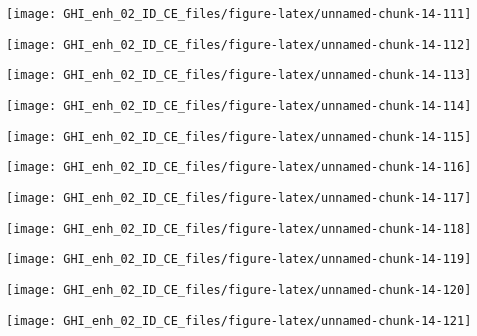 \documentclass[
  10pt,
  a4paper,oneside]{article}
\begin{document}
\begin{center}\texttt{[image: GHI\_enh\_02\_ID\_CE\_files/figure-latex/unnamed-chunk-14-111]} \end{center}

\begin{center}\texttt{[image: GHI\_enh\_02\_ID\_CE\_files/figure-latex/unnamed-chunk-14-112]} \end{center}

\begin{center}\texttt{[image: GHI\_enh\_02\_ID\_CE\_files/figure-latex/unnamed-chunk-14-113]} \end{center}

\begin{center}\texttt{[image: GHI\_enh\_02\_ID\_CE\_files/figure-latex/unnamed-chunk-14-114]} \end{center}

\begin{center}\texttt{[image: GHI\_enh\_02\_ID\_CE\_files/figure-latex/unnamed-chunk-14-115]} \end{center}

\begin{center}\texttt{[image: GHI\_enh\_02\_ID\_CE\_files/figure-latex/unnamed-chunk-14-116]} \end{center}

\begin{center}\texttt{[image: GHI\_enh\_02\_ID\_CE\_files/figure-latex/unnamed-chunk-14-117]} \end{center}

\begin{center}\texttt{[image: GHI\_enh\_02\_ID\_CE\_files/figure-latex/unnamed-chunk-14-118]} \end{center}

\begin{center}\texttt{[image: GHI\_enh\_02\_ID\_CE\_files/figure-latex/unnamed-chunk-14-119]} \end{center}

\begin{center}\texttt{[image: GHI\_enh\_02\_ID\_CE\_files/figure-latex/unnamed-chunk-14-120]} \end{center}

\begin{center}\texttt{[image: GHI\_enh\_02\_ID\_CE\_files/figure-latex/unnamed-chunk-14-121]} \end{center}
\end{document}

